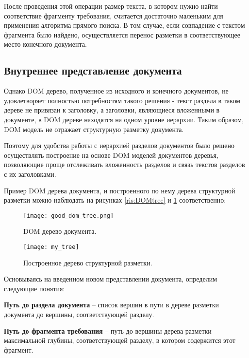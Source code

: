 После проведения этой операции размер текста, в котором нужно найти соответствие фрагменту требования, считается достаточно маленьким для применения алгоритма прямого поиска. В том случае, если совпадение с текстом фрагмента было найдено, осуществляется перенос разметки в соответствующее место конечного документа.

\subsection{Внутреннее представление документа}

Однако DOM дерево, полученное из исходного и конечного документов, не удовлетворяет полностью потребностям такого решения - текст раздела в таком дереве не привязан к заголовку, а заголовки, являющиеся вложенными в документе, в DOM дереве находятся на одном уровне иерархии. Таким образом, DOM модель не отражает структурную разметку документа.

Поэтому для удобства работы с иерархией разделов документов было решено осуществлять построение на основе DOM моделей документов деревья, позволяющие проще отслеживать вложенность разделов и связь текстов разделов с их заголовками.

Пример DOM дерева документа, и построенного по нему дерева структурной разметки можно наблюдать на рисунках \ref{ris:DOMtree} и \ref{ris:MYtree} соответственно:

\begin{figure}[h]
\begin{center}
\begin{minipage}[h]{0.55\linewidth}
\texttt{[image: good\_dom\_tree.png]}
\caption{DOM дерево документа.} %
\label{ris:DOMtree} %
\end{minipage}
\hfill 
\begin{minipage}[h]{0.4\linewidth}
\texttt{[image: my\_tree]}
\caption{Построенное дерево структурной разметки.}
\label{ris:MYtree}
\end{minipage}
\end{center}
\end{figure}

Основываясь на введенном новом представлении документа, определим следующие понятия:

\textbf{Путь до раздела документа} – список вершин в пути в дереве разметки документа до вершины, соответствующей разделу.

\textbf{Путь до фрагмента требования} – путь до вершины дерева разметки максимальной глубины, соответствующей разделу, в котором содержится этот фрагмент.

